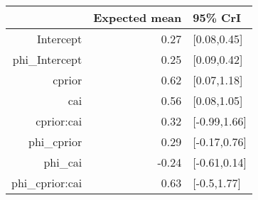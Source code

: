 \begin{tabular}{rrl}
  \hline
 & Expected mean & 95\% CrI \\ 
  \hline
Intercept & 0.27 & [0.08,0.45] \\ 
  phi\_Intercept & 0.25 & [0.09,0.42] \\ 
  cprior & 0.62 & [0.07,1.18] \\ 
  cai & 0.56 & [0.08,1.05] \\ 
  cprior:cai & 0.32 & [-0.99,1.66] \\ 
  phi\_cprior & 0.29 & [-0.17,0.76] \\ 
  phi\_cai & -0.24 & [-0.61,0.14] \\ 
  phi\_cprior:cai & 0.63 & [-0.5,1.77] \\ 
   \hline
\end{tabular}

